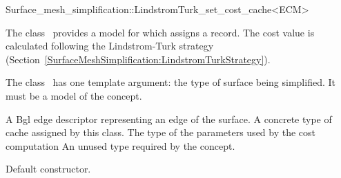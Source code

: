 

\begin{ccRefClass}{Surface_mesh_simplification::LindstromTurk_set_cost_cache<ECM>}


\ccDefinition

The class \ccRefName\ provides a model for 
 which assigns a  record.
The cost value is calculated following the Lindstrom-Turk strategy
(Section~\ref{SurfaceMeshSimplification:LindstromTurkStrategy}).

The class \ccRefName\ has one template argument: the type of surface being simplified. 
It must be a model of the  concept.

\ccIsModel
{}


\ccTypes
  \ccGlue
  {A {\sc Bgl} edge descriptor representing an edge of the surface.}
  \ccGlue
  {A concrete type of cache assigned by this class.}
  \ccGlue
  {The type of the parameters used by the cost computation}
  \ccGlue
  {An unused type required by the  concept.}
            
\ccCreation
{}  %

{Default constructor.}


\end{ccRefClass}
